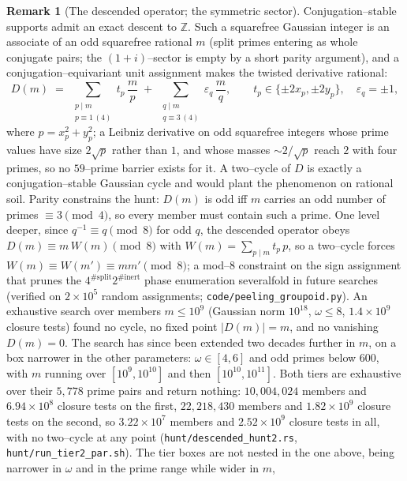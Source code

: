 \documentclass[11pt]{article}
\theoremstyle{definition}
\newtheorem{remark}[theorem]{Remark}
\begin{document}
\begin{remark}[The descended operator; the symmetric sector]\label{rem:descent}
Conjugation--stable supports admit an exact descent to $\mathbb{Z}$. Such a squarefree Gaussian integer
is an associate of an odd squarefree rational $m$ (split primes entering as whole conjugate pairs; the
$(1+i)$--sector is empty by a short parity argument), and a conjugation--equivariant unit assignment
makes the twisted derivative rational:
\[ D(m)\;=\;\sum_{\substack{p\mid m\\ p\equiv1\,(4)}} t_p\,\frac mp\;+\;\sum_{\substack{q\mid m\\
q\equiv3\,(4)}}\varepsilon_q\,\frac mq, \qquad t_p\in\{\pm2x_p,\pm2y_p\},\quad \varepsilon_q=\pm1, \]
where $p=x_p^2+y_p^2$; a Leibniz derivative on odd squarefree integers whose prime values have size
$2\sqrt p$ rather than $1$, and whose masses ${\sim}2/\sqrt p$ reach $2$ with four primes, so no
$59$--prime barrier exists for it. A two--cycle of $D$ is exactly a conjugation--stable Gaussian cycle
and would plant the phenomenon on rational soil. Parity constrains the hunt: $D(m)$ is odd iff $m$
carries an odd number of primes $\equiv3\pmod4$, so every member must contain such a prime.
One level deeper, since $q^{-1}\equiv q\pmod 8$ for odd $q$, the descended operator obeys
$D(m)\equiv m\,W(m)\pmod 8$ with $W(m)=\sum_{p\mid m}t_p\,p$, so a two--cycle forces
$W(m)\equiv W(m')\equiv mm'\pmod 8$; a mod--$8$ constraint on the sign assignment that prunes
the $4^{\#\mathrm{split}}2^{\#\mathrm{inert}}$ phase enumeration severalfold in future searches
(verified on $2\times10^5$ random assignments; \texttt{code/peeling\_groupoid.py}). An
exhaustive search over members $m\le10^9$ (Gaussian norm $10^{18}$, $\omega\le8$, $1.4\times10^9$
closure tests) found no cycle, no fixed point $|D(m)|=m$, and no vanishing $D(m)=0$. The search
has since been extended two decades further in $m$, on a box narrower in the other parameters:
$\omega\in[4,6]$ and odd primes below $600$, with $m$ running over $[10^9,10^{10}]$ and then
$[10^{10},10^{11}]$. Both tiers are exhaustive over their $5{,}778$ prime pairs and return nothing:
$10{,}004{,}024$ members and $6.94\times10^8$ closure tests on the first, $22{,}218{,}430$ members
and $1.82\times10^9$ closure tests on the second, so $3.22\times10^7$ members and
$2.52\times10^9$ closure tests in all, with no two--cycle at any point
\textup{(\texttt{hunt/descended\_hunt2.rs}, \texttt{hunt/run\_tier2\_par.sh})}. The tier boxes are
not nested in the one above, being narrower in $\omega$ and in the prime range while wider in $m$,

\end{remark}
\end{document}
